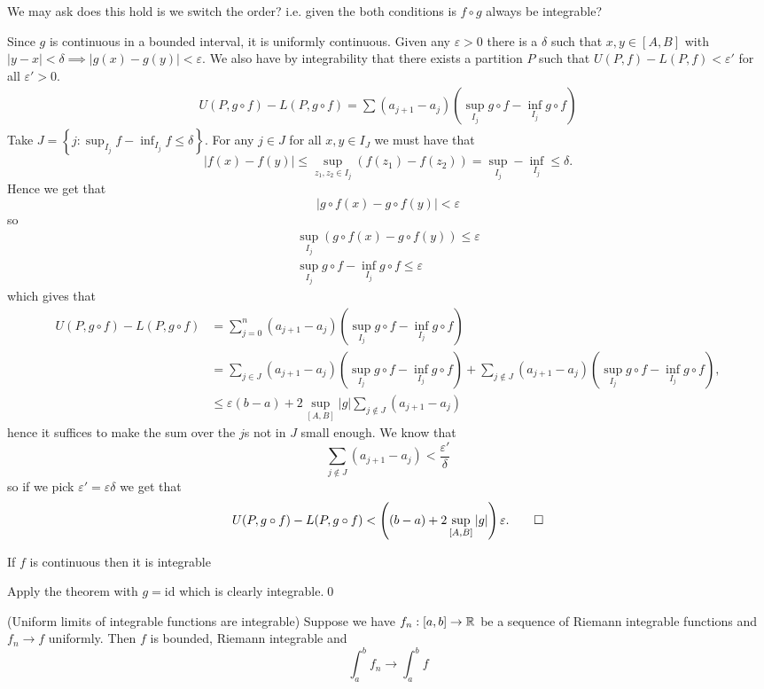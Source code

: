 \documentclass{article}
\newcommand{\eps}{\varepsilon}
\begin{document}
We may ask does this hold is we switch the order? i.e. given the both conditions is $ f\circ g$ always be integrable?\par
\pf Since $ g $ is continuous in a bounded interval, it is uniformly continuous. Given any $ \eps >0 $ there is a $ \delta $ such that $ x,y\in [A,B] $ with $ |y-x|<\delta\implies|g(x)-g(y)|<\eps $. We also have by integrability that there exists a partition $ P $ such that $ U(P,f)-L(P,f)<\eps' $ for all $ \eps' >0 $.
\begin{align*}
	U(P,g\circ f)-L(P, g\circ f)=\sum (a_{j+1}-a_j)\left(\sup_{I_j}g\circ f-\inf_{I_j}g\circ f\right)
\end{align*}
Take $ J=\left\{j: \sup_{I_j}f -\inf_{I_j}f\le \delta \right\}$. For any $ j\in J $ for all $ x,y \in I_J $ we must have that
\[
	|f(x)-f(y)|\le \sup_{z_1,z_2\in I_j}(f(z_1)-f(z_2))=\sup_{I_j}-\inf_{I_j}\le \delta.
\]
Hence we get that
\[
  |g\circ f(x)-g\circ f(y)|<\eps
\]
so
\begin{align*}
	\sup_{I_j}\left(g\circ f(x)-g\circ f(y)\right)\le \eps\\
	\sup_{I_j}g\circ f - \inf_{I_j}g\circ f\le \eps
\end{align*}
which gives that
\begin{align*}
	U(P,g\circ f)-L(P,g\circ f)&=\sum_{j=0}^n(a_{j+1}-a_j)\left(\sup_{I_j}g\circ f-\inf_{I_j}g\circ f\right)\\
				   &=\sum_{j\in J}(a_{j+1}-a_j)\left(\sup_{I_j}g\circ f-\inf_{I_j}g\circ f\right)+\sum_{j\notin J}(a_{j+1}-a_j)\left(\sup_{I_j}g\circ f-\inf_{I_j}g\circ f\right),\\
				   &\le \eps(b-a)+2\sup_{[A,B]}|g|\sum_{j\notin J} (a_{j+1}-a_j)
\end{align*}
hence it suffices to make the sum over the $ j $s not in $ J $ small enough. We know that
\[
	\sum_{j\notin J}(a_{j+1}-a_j)<\frac{\eps'}\delta
\]
so if we pick $ \eps'=\eps \delta $ we get that 
\[
	U(P,g\circ f)-L(P,g\circ f)<\left((b-a)+2\sup_{[A,B]}|g|\right)\eps.\qed
\]
\begin{corollary}
  If $ f $ is continuous then it is integrable
\end{corollary}
\pf Apply the theorem with $ g=\mathrm{id} $ which is clearly integrable.\qed
\begin{theorem}
	(Uniform limits of integrable functions are integrable) Suppose we have $ f_n:[a,b]\to\mathbb{R} $ be a sequence of Riemann integrable functions and $ f_n\to f $ uniformly. Then $ f $ is bounded, Riemann integrable and
	\[
		\int_a^bf_n\to \int_a^bf
	\]
\end{theorem}
\end{document}
